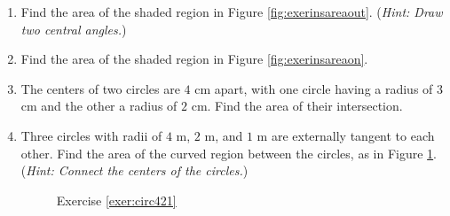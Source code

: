 {\begin{enumerate}[\bfseries 1.]
\begin{figure}[h]
\begin{minipage}[b]{5cm}
\end{minipage}
\end{figure}
 \item\label{exer:insareaout} Find the area of the shaded region in Figure \ref{fig:exerinsareaout}.
 (\emph{Hint: Draw two central angles.})
 \item\label{exer:insareaon} Find the area of the shaded region in Figure \ref{fig:exerinsareaon}.
 \item The centers of two circles are $4$ cm apart, with one circle having a radius of $3$ cm and
  the other a radius of $2$ cm. Find the area of their intersection.
 \item\label{exer:circ421} Three circles with radii of $4$ m, $2$ m, and $1$ m are externally
  tangent to each other. Find the area of the curved region between the circles, as in Figure
  \ref{fig:exercirc421}. (\emph{Hint: Connect the centers of the circles.})
\begin{figure}[h]
\begin{minipage}[b]{7.5cm}
 \begin{center}
  \vspace{-5mm}
 \end{center}
 \caption[]{\quad Exercise \ref{exer:circ421}}
 \label{fig:exercirc421}
\end{minipage}
\begin{minipage}[b]{7.5cm}
 \begin{center}
\end{center}
\end{minipage}
\end{figure}
\end{enumerate}}
